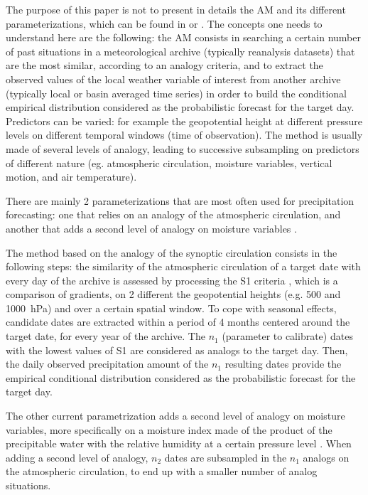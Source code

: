 \documentclass{ametsoc}
\begin{document}
The purpose of this paper is not to present in details the AM and its different parameterizations, which can be found in \citet{Horton2016} or \citet{BenDaoud2015}. The concepts one needs to understand here are the following: the AM consists in searching a certain number of past situations in a meteorological archive (typically reanalysis datasets) that are the most similar, according to an analogy criteria, and to extract the observed values of the local weather variable of interest from another archive (typically local or basin averaged time series) in order to build the conditional empirical distribution considered as the probabilistic forecast for the target day. Predictors can be varied: for example the geopotential height at different pressure levels on different temporal windows (time of observation). The method is usually made of several levels of analogy, leading to successive subsampling on predictors of different nature (eg. atmospheric circulation, moisture variables, vertical motion, and air temperature).

There are mainly 2 parameterizations that are most often used for precipitation forecasting: one that relies on an analogy of the atmospheric circulation, and another that adds a second level of analogy on moisture variables \citep{Obled2002, Bontron2005, Marty2012}.

The method based on the analogy of the synoptic circulation consists in the following steps: the similarity of the atmospheric circulation of a target date with every day of the archive is assessed by processing the S1 criteria \citep{Teweles1954, Drosdowsky2003}, which is a comparison of gradients, on 2 different the geopotential heights (e.g. 500 and 1000~hPa) and over a certain spatial window. To cope with seasonal effects, candidate dates are extracted within a period of 4 months centered around the target date, for every year of the archive. The $n_{1}$ (parameter to calibrate) dates with the lowest values of S1 are considered as analogs to the target day. Then, the daily observed precipitation amount of the $n_{1}$ resulting dates provide the empirical conditional distribution considered as the probabilistic forecast for the target day.

The other current parametrization adds a second level of analogy on moisture variables, more specifically on a moisture index made of the product of the precipitable water with the relative humidity at a certain pressure level \citep[e.g. 850~hPa, see][]{Bontron2004}. When adding a second level of analogy, $n_{2}$ dates are subsampled in the $n_{1}$ analogs on the atmospheric circulation, to end up with a smaller number of analog situations.
\end{document}
